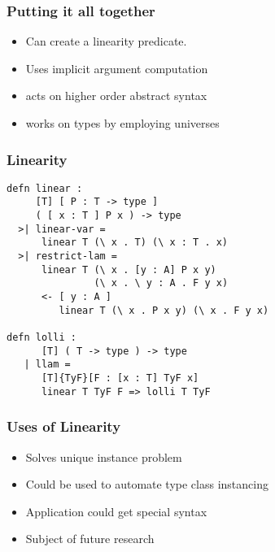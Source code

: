 \begin{frame}
\frametitle{Putting it all together}
\begin{itemize}
\item Can create a linearity predicate.
\item Uses implicit argument computation
\item acts on higher order abstract syntax
\item works on types by employing universes
\end{itemize}
\end{frame}


\begin{frame}[fragile]
\frametitle{Linearity}
\begin{lstlisting}
defn linear : 
     [T] [ P : T -> type ] 
     ( [ x : T ] P x ) -> type
  >| linear-var = 
      linear T (\ x . T) (\ x : T . x)
  >| restrict-lam = 
      linear T (\ x . [y : A] P x y) 
               (\ x . \ y : A . F y x)
      <- [ y : A ] 
         linear T (\ x . P x y) (\ x . F y x)

defn lolli : 
      [T] ( T -> type ) -> type
   | llam = 
      [T]{TyF}[F : [x : T] TyF x]
      linear T TyF F => lolli T TyF
\end{lstlisting}
\end{frame}


\begin{frame}
\frametitle{Uses of Linearity}
\begin{itemize}
\item Solves unique instance problem
\item Could be used to automate type class instancing
\item Application could get special syntax
\item Subject of future research
\end{itemize}
\end{frame}
